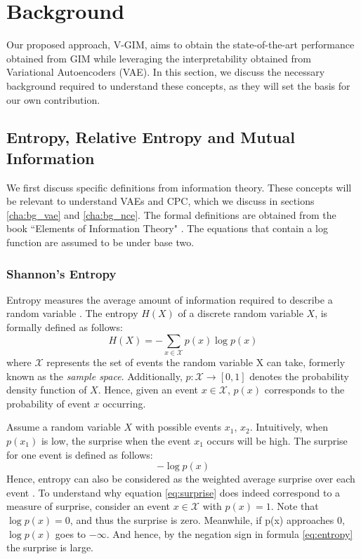 
\chapter{Background} \label{cha:2}

Our proposed approach, V-GIM, aims to obtain the state-of-the-art performance obtained from GIM while leveraging the interpretability obtained from Variational Autoencoders (VAE). In this section, we discuss the necessary background required to understand these concepts, as they will set the basis for our own contribution.



\section{Entropy, Relative Entropy and Mutual Information}
We first discuss specific definitions from information theory. These concepts will be relevant to understand VAEs and CPC, which we discuss in sections \ref{cha:bg_vae} and \ref{cha:bg_nce}. The formal definitions are obtained from the book ``Elements of Information Theory" \citep{coverElementsInformationTheory2006}. The equations that contain a log function are assumed to be under base two.

\subsection{Shannon's Entropy}
Entropy measures the average amount of information required to describe a random variable \citep{coverElementsInformationTheory2006}. The entropy $H(X)$ of a discrete random variable $X$, is formally defined as follows: 
\begin{equation}
	H(X) = -\sum_{x\in\mathcal{X}} p(x) \log p(x)  \label{eq:entropy}
\end{equation}
where $\mathcal{X}$ represents the set of events the random variable X can take, formerly known as the \textit{sample space}. Additionally, $p: \mathcal{X} \rightarrow [0, 1]$ denotes the probability density function of $X$. Hence, given an event $ x \in \mathcal{X}$, $p(x)$ corresponds to the probability of event $x$ occurring.

Assume a random variable $X$ with possible events $x_1$, $x_2$. Intuitively, when $p(x_1)$ is low, the surprise when the event $x_1$ occurs will be high. The surprise for one event is defined as follows:
\begin{equation}
	- \log p(x) \label{eq:surprise}
\end{equation}
Hence, entropy can also be considered as the weighted average surprise over each event \citep{datasciencecoursesAliGhodsiLec2017}. 
To understand why equation \ref{eq:surprise} does indeed correspond to a measure of surprise, consider an event $x \in \mathcal{X}$ with $p(x) = 1$. Note that $\log p(x) = 0$, and thus the surprise is zero. Meanwhile, if p(x) approaches $0$, $\log p(x)$ goes to $- \infty$. And hence, by the negation sign in formula \ref{eq:entropy} the surprise is large.


